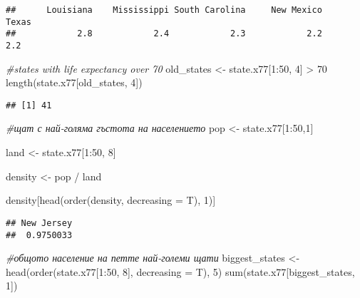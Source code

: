 \documentclass[
]{article}
\newenvironment{Shaded}{\begin{snugshade}}{\end{snugshade}}
\newcommand{\AttributeTok}[1]{\textcolor[rgb]{0.77,0.63,0.00}{#1}}
\newcommand{\CommentTok}[1]{\textcolor[rgb]{0.56,0.35,0.01}{\textit{#1}}}
\newcommand{\DecValTok}[1]{\textcolor[rgb]{0.00,0.00,0.81}{#1}}
\newcommand{\FunctionTok}[1]{\textcolor[rgb]{0.00,0.00,0.00}{#1}}
\newcommand{\NormalTok}[1]{#1}
\newcommand{\OtherTok}[1]{\textcolor[rgb]{0.56,0.35,0.01}{#1}}
\newcommand{\SpecialCharTok}[1]{\textcolor[rgb]{0.00,0.00,0.00}{#1}}
\begin{document}
\begin{verbatim}
##      Louisiana    Mississippi South Carolina     New Mexico          Texas 
##            2.8            2.4            2.3            2.2            2.2
\end{verbatim}

\begin{Shaded}
\begin{Highlighting}[]
\CommentTok{\#states with life expectancy over 70}
\NormalTok{old\_states }\OtherTok{\textless{}{-}}\NormalTok{ state.x77[}\DecValTok{1}\SpecialCharTok{:}\DecValTok{50}\NormalTok{, }\DecValTok{4}\NormalTok{] }\SpecialCharTok{\textgreater{}} \DecValTok{70}
\FunctionTok{length}\NormalTok{(state.x77[old\_states, }\DecValTok{4}\NormalTok{])}
\end{Highlighting}
\end{Shaded}

\begin{verbatim}
## [1] 41
\end{verbatim}

\begin{Shaded}
\begin{Highlighting}[]
\CommentTok{\#щат с най{-}голяма гъстота на населението}
\NormalTok{pop }\OtherTok{\textless{}{-}}\NormalTok{ state.x77[}\DecValTok{1}\SpecialCharTok{:}\DecValTok{50}\NormalTok{,}\DecValTok{1}\NormalTok{]}

\NormalTok{land }\OtherTok{\textless{}{-}}\NormalTok{ state.x77[}\DecValTok{1}\SpecialCharTok{:}\DecValTok{50}\NormalTok{, }\DecValTok{8}\NormalTok{]}

\NormalTok{density }\OtherTok{\textless{}{-}}\NormalTok{ pop }\SpecialCharTok{/}\NormalTok{ land}

\NormalTok{density[}\FunctionTok{head}\NormalTok{(}\FunctionTok{order}\NormalTok{(density, }\AttributeTok{decreasing =}\NormalTok{ T), }\DecValTok{1}\NormalTok{)]}
\end{Highlighting}
\end{Shaded}

\begin{verbatim}
## New Jersey 
##  0.9750033
\end{verbatim}

\begin{Shaded}
\begin{Highlighting}[]
\CommentTok{\#общото население на петте най{-}големи щати}
\NormalTok{biggest\_states }\OtherTok{\textless{}{-}} \FunctionTok{head}\NormalTok{(}\FunctionTok{order}\NormalTok{(state.x77[}\DecValTok{1}\SpecialCharTok{:}\DecValTok{50}\NormalTok{, }\DecValTok{8}\NormalTok{], }\AttributeTok{decreasing =}\NormalTok{ T), }\DecValTok{5}\NormalTok{)}
\FunctionTok{sum}\NormalTok{(state.x77[biggest\_states, }\DecValTok{1}\NormalTok{])}
\end{Highlighting}
\end{Shaded}
\end{document}
